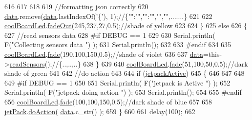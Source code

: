 \begin{DoxyCode}
616 
617         
618 
619         \textcolor{comment}{//formatting json correctly}
620         \hyperlink{class_cool_board_a427fb753dd8575bdf821c70a5c63d695}{data}.remove(\hyperlink{class_cool_board_a427fb753dd8575bdf821c70a5c63d695}{data}.lastIndexOf(\textcolor{charliteral}{'\{'}), 1);\textcolor{comment}{//\{"":"","":"","","",.......\}}
621 
622         \hyperlink{class_cool_board_a1b1d3c684a5baa56b08486e192fd8e97}{coolBoardLed}.\hyperlink{class_cool_board_led_a93d545679237e8cc858324367149775c}{fadeOut}(245,237,27,0.5);\textcolor{comment}{//shade of yellow}
623                 
624     \}   
625     \textcolor{keywordflow}{else}
626     \{
627         \textcolor{comment}{//read sensors data}
628 \textcolor{preprocessor}{    #if DEBUG == 1}
629 
630         Serial.println( F(\textcolor{stringliteral}{"Collecting sensors data "}) );
631         Serial.println();
632 
633 \textcolor{preprocessor}{    #endif}
634 
635         \hyperlink{class_cool_board_a1b1d3c684a5baa56b08486e192fd8e97}{coolBoardLed}.\hyperlink{class_cool_board_led_af1cacbaa88db8bcf6042c1083ba41155}{fade}(190,100,150,0.5);\textcolor{comment}{//shade of violet        }
636 
637         \hyperlink{class_cool_board_a427fb753dd8575bdf821c70a5c63d695}{data}=this->\hyperlink{class_cool_board_ad03abdce2e65f520bbf2cff0f2d083cf}{readSensors}();\textcolor{comment}{//\{..,..,..\}}
638     \}
639 
640     \hyperlink{class_cool_board_a1b1d3c684a5baa56b08486e192fd8e97}{coolBoardLed}.\hyperlink{class_cool_board_led_af1cacbaa88db8bcf6042c1083ba41155}{fade}(51,100,50,0.5);\textcolor{comment}{//dark shade of green  }
641 
642     \textcolor{comment}{//do action}
643 
644     \textcolor{keywordflow}{if} (\hyperlink{class_cool_board_a9be03a913d26e558328935ca3b59a75e}{jetpackActive})
645     \{
646     
647 
648 
649 \textcolor{preprocessor}{    #if DEBUG == 1}
650 
651         Serial.println( F(\textcolor{stringliteral}{"jetpack is Active "}) );
652         Serial.println( F(\textcolor{stringliteral}{"jetpack doing action "}) );
653         Serial.println();
654     
655 \textcolor{preprocessor}{    #endif}
656         \hyperlink{class_cool_board_a1b1d3c684a5baa56b08486e192fd8e97}{coolBoardLed}.\hyperlink{class_cool_board_led_af1cacbaa88db8bcf6042c1083ba41155}{fade}(100,100,150,0.5);\textcolor{comment}{//dark shade of blue }
657     
658         \hyperlink{class_cool_board_a30b1357881b01ccbec676856a91e48e9}{jetPack}.\hyperlink{class_jetpack_a9e703197093094b963f9ad57817495b8}{doAction}( \hyperlink{class_cool_board_a427fb753dd8575bdf821c70a5c63d695}{data}.c\_str() );
659     \}
660     
661     delay(100);
662 

\end{DoxyCode}
